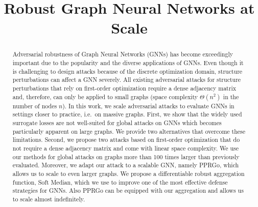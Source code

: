 \documentclass[sigconf, review]{acmart}
\begin{document}
\title{Robust Graph Neural Networks at Scale}


\renewcommand{\shortauthors}{Geisler et al.}

\begin{abstract}
  Adversarial robustness of Graph Neural Networks (GNNs) has become exceedingly important due to the popularity and the diverse applications of GNNs. Even though it is challenging to design attacks because of the discrete optimization domain, structure perturbations can affect a GNN severely. All existing adversarial attacks for structure perturbations that rely on first-order optimization require a dense adjacency matrix and, therefore, can only be applied to small graphs (space complexity \(\Theta(n^2)\) in the number of nodes \(n\)). In this work, we scale adversarial attacks to evaluate GNNs in settings closer to practice, i.e.\ on massive graphs.
  First, we show that the widely used surrogate losses are not well-suited for global attacks on GNNs which becomes particularly apparent on large graphs. We provide two alternatives that overcome these limitations. 
  Second, we propose two attacks based on first-order optimization that do not require a dense adjacency matrix and come with linear space complexity. We use our methods for global attacks on graphs more than 100 times larger than previously evaluated. Moreover, we adapt our attack to a scalable GNN, namely PPRGo, which allows us to scale to even larger graphs.
  We propose a differentiable robust aggregation function, Soft Median, which we use to improve one of the most effective defense strategies for GNNs. Also PPRGo can be equipped with our aggregation and allows us to scale almost indefinitely.
\end{abstract}
\end{document}
